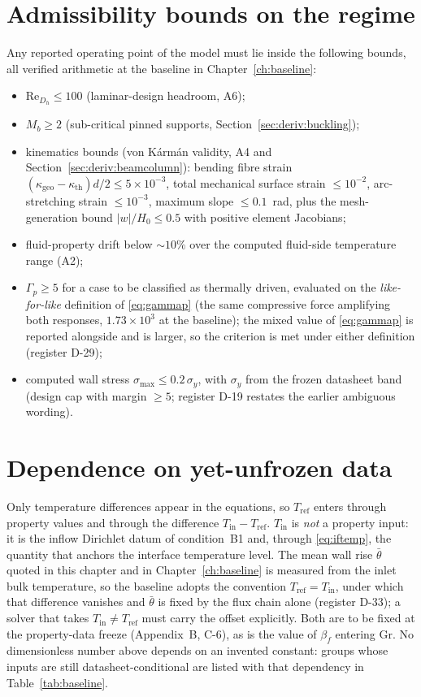 \section{Admissibility bounds on the regime}
Any reported operating point of the model must lie inside the following bounds, all verified
arithmetic at the baseline in Chapter~\ref{ch:baseline}:
\begin{itemize}\itemsep1pt
\item[A-1] $\mathrm{Re}_{D_h}\le100$ (laminar-design headroom, A6);
\item[A-2] $M_b\ge2$ (sub-critical pinned supports, Section~\ref{sec:deriv:buckling});
\item[A-3] kinematics bounds (von K\'arm\'an validity, A4 and
Section~\ref{sec:deriv:beamcolumn}): bending fibre strain
$(\kappa_{\mathrm{geo}}-\kappa_{\mathrm{th}})d/2\le5\times10^{-3}$, total mechanical surface
strain $\le10^{-2}$, arc-stretching strain $\le10^{-3}$, maximum slope $\le0.1$~rad, plus the
mesh-generation bound $|w|/H_0\le0.5$ with positive element Jacobians;
\item[A-4] fluid-property drift below $\sim10\%$ over the computed fluid-side temperature range (A2);
\item[A-5] $\Gamma_p\ge5$ for a case to be classified as thermally driven, evaluated on the
\emph{like-for-like} definition of \eqref{eq:gammap} (the same compressive force amplifying both
responses, $1.73\times10^3$ at the baseline); the mixed value of \eqref{eq:gammap} is reported
alongside and is larger, so the criterion is met under either definition (register D-29);
\item[A-6] computed wall stress $\sigma_{\max}\le0.2\,\sigma_y$, with $\sigma_y$ from the frozen
datasheet band (design cap with margin $\ge5$; register D-19 restates the earlier ambiguous
wording).
\end{itemize}

\section{Dependence on yet-unfrozen data}
Only temperature differences appear in the equations, so $T_{\mathrm{ref}}$ enters through
property values and through the difference $T_{\mathrm{in}}-T_{\mathrm{ref}}$. $T_{\mathrm{in}}$ is
\emph{not} a property input: it is the inflow Dirichlet datum of condition~B1 and, through
\eqref{eq:iftemp}, the quantity that anchors the interface temperature level. The mean wall rise
$\bar\theta$ quoted in this chapter and in Chapter~\ref{ch:baseline} is measured from the inlet bulk
temperature, so the baseline adopts the convention $T_{\mathrm{ref}}=T_{\mathrm{in}}$, under which
that difference vanishes and $\bar\theta$ is fixed by the flux chain alone (register D-33); a solver
that takes $T_{\mathrm{in}}\ne T_{\mathrm{ref}}$ must carry the offset explicitly. Both are to be
fixed at the property-data freeze (Appendix~B, C-6), as is the value of $\beta_f$ entering
$\mathrm{Gr}$. No dimensionless
number above depends on an invented constant: groups whose inputs are still datasheet-conditional
are listed with that dependency in Table~\ref{tab:baseline}.
